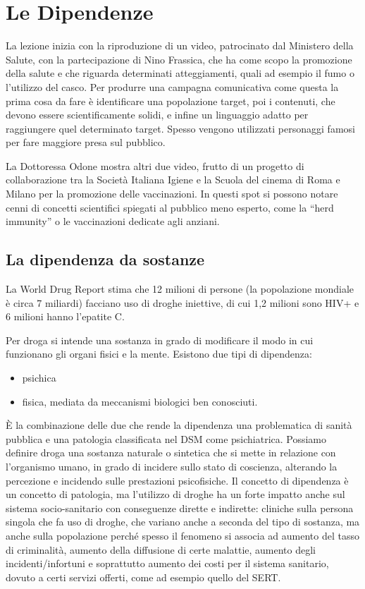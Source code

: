 
\section{Le Dipendenze }


La lezione inizia con la riproduzione di un video, patrocinato dal
Ministero della Salute, con la partecipazione di Nino Frassica, che ha
come scopo la promozione della salute e che riguarda determinati
atteggiamenti, quali ad esempio il fumo o l'utilizzo del casco. Per
produrre una campagna comunicativa come questa la prima cosa da fare è
identificare una popolazione target, poi i contenuti, che devono essere
scientificamente solidi, e infine un linguaggio adatto per raggiungere
quel determinato target. Spesso vengono utilizzati personaggi famosi per
fare maggiore presa sul pubblico.

La Dottoressa Odone mostra altri due video, frutto di un progetto di
collaborazione tra la Società Italiana Igiene e la Scuola del cinema di
Roma e Milano per la promozione delle vaccinazioni. In questi spot si
possono notare cenni di concetti scientifici spiegati al pubblico meno
esperto, come la ``herd immunity'' o le vaccinazioni dedicate agli
anziani.


\subsection{La dipendenza da sostanze}


La World Drug Report stima che 12 milioni di persone (la popolazione
mondiale è circa 7 miliardi) facciano uso di droghe iniettive, di cui
1,2 milioni sono HIV+ e 6 milioni hanno l'epatite C.

Per droga si intende una sostanza in grado di modificare il modo in cui
funzionano gli organi fisici e la mente. Esistono due tipi di
dipendenza:

\begin{itemize}
\item
  psichica
\item
  fisica, mediata da meccanismi biologici ben conosciuti.
\end{itemize}

È la combinazione delle due che rende la dipendenza una problematica di
sanità pubblica e una patologia classificata nel DSM come psichiatrica.
Possiamo definire droga una sostanza naturale o sintetica che si mette
in relazione con l'organismo umano, in grado di incidere sullo stato di
coscienza, alterando la percezione e incidendo sulle prestazioni
psicofisiche. Il concetto di dipendenza è un concetto di patologia, ma
l'utilizzo di droghe ha un forte impatto anche sul sistema
socio-sanitario con conseguenze dirette e indirette: cliniche sulla
persona singola che fa uso di droghe, che variano anche a seconda del
tipo di sostanza, ma anche sulla popolazione perché spesso il fenomeno
si associa ad aumento del tasso di criminalità, aumento della diffusione
di certe malattie, aumento degli incidenti/infortuni e soprattutto
aumento dei costi per il sistema sanitario, dovuto a certi servizi
offerti, come ad esempio quello del SERT.

